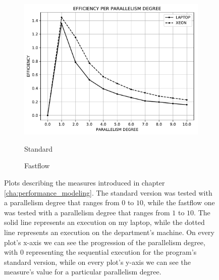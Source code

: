 \begin{figure}
\begin{subfigure}{0.33\textwidth}
{                \includegraphics{imgs/efficiency_standard.pdf}
            }
            \caption{Standard}
            \label{fig:efficiency_standard}
        \end{subfigure}
        \begin{subfigure}{0.33\textwidth}
            \caption{Fastflow}
            \label{fig:efficiency_fastflow}
        \end{subfigure}
        \caption{Plots describing the measures introduced in chapter \ref{cha:performance_modeling}. The standard
        version was tested with a parallelism degree that ranges from $0$ to $10$, while the fastflow one was
        tested with a parallelism degree that ranges from $1$ to $10$. The solid line represents an execution
        on my laptop, while the dotted line represents an execution on the department's machine. On every
        plot's x-axis we can see the progression of the parallelism degree, with $0$ representing
        the sequential execution for the program's standard version, while on every plot's
        y-axis we can see the measure's value for a particular parallelism degree.}
        \label{fig:performances}
    \end{figure}
    \newpage
    \setcounter{page}{3}
